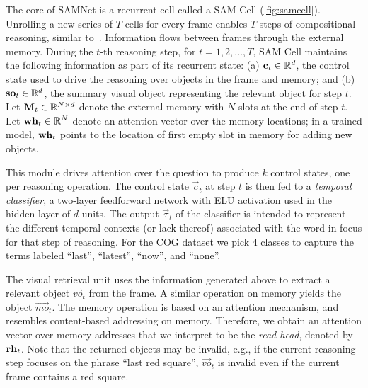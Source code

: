 The core of SAMNet is a recurrent cell called a SAM Cell (\cref{fig:samcell}). 
Unrolling a new series of $T$ cells for every frame enables $T$ steps of compositional
reasoning, similar to~\cite{hudson2018compositional}.
Information flows between frames through the external memory. 
During the $t$-th reasoning step, for $t=1,2, \dots, T$, SAM Cell maintains the following information as part of its recurrent state:
(a) $\mathbf{c}_t \in \mathbb{R}^d$, the control state used to drive the reasoning over objects in the frame and memory; and
(b) $\mathbf{so}_t  \in \mathbb{R}^d$, the summary visual object representing the relevant object for step $t$.
Let $\mathbf{M}_t \in  \mathbb{R}^{N \times d}$ denote the external memory with $N$ slots at the end of step $t$.
Let $\mathbf{wh}_t \in  \mathbb{R}^N$ denote an attention vector over the memory locations;
in a trained model, $\mathbf{wh}_t$ points to the location of first empty slot in memory for adding new objects.   

This module drives attention over the question to produce $k$ control states, one per reasoning operation. 
The control state $\vec{c}_t$ at step $t$ is then fed to a \emph{temporal classifier}, 
a two-layer feedforward network with ELU activation used in the hidden layer of $d$ units.
The output $\vec{\tau}_t$ of the classifier is intended to represent the different temporal contexts (or lack thereof) associated with the word in focus for that step of reasoning.	
For the COG dataset we pick 4 classes to capture the terms labeled ``last'', ``latest'', ``now'', and ``none''.

The visual retrieval unit uses the information generated above to extract a relevant object $\vec{vo}_t$ from the frame.
A similar operation on memory yields the object $\vec{mo}_t$. The memory operation is based on an attention mechanism,
and resembles content-based addressing on memory. Therefore, we obtain an attention vector over memory addresses
that we interpret to be the \emph{read head}, denoted by $\mathbf{rh}_t$.
Note that the returned objects may be invalid, 
e.g., if the current reasoning step focuses on the phrase ``last red square'', $\vec{vo}_t$ is invalid 
even if the current frame contains a red square. 

